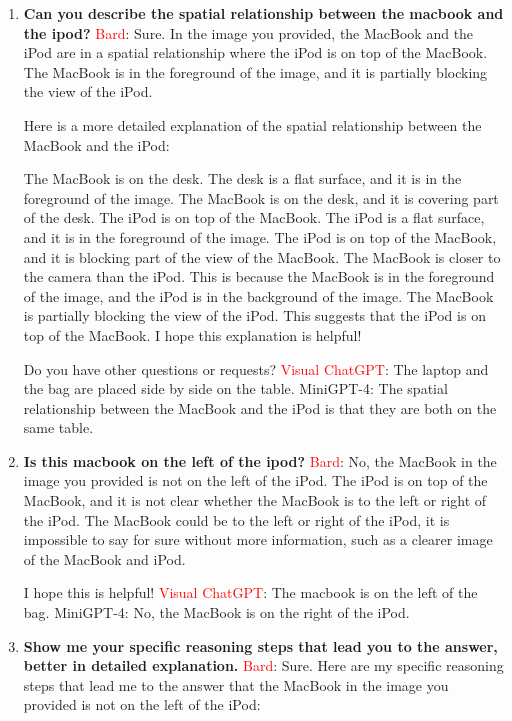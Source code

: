 \begin{enumerate}
    \item \textbf{Can you describe the spatial relationship between the macbook and the ipod?}
    \subitem \textcolor{Red}{Bard}: 
    Sure. In the image you provided, the MacBook and the iPod are in a spatial relationship where the iPod is on top of the MacBook. The MacBook is in the foreground of the image, and it is partially blocking the view of the iPod.
    
    Here is a more detailed explanation of the spatial relationship between the MacBook and the iPod:
    
    The MacBook is on the desk. The desk is a flat surface, and it is in the foreground of the image. The MacBook is on the desk, and it is covering part of the desk.
    The iPod is on top of the MacBook. The iPod is a flat surface, and it is in the foreground of the image. The iPod is on top of the MacBook, and it is blocking part of the view of the MacBook.
    The MacBook is closer to the camera than the iPod. This is because the MacBook is in the foreground of the image, and the iPod is in the background of the image.
    The MacBook is partially blocking the view of the iPod. This suggests that the iPod is on top of the MacBook.
    I hope this explanation is helpful!
    
    Do you have other questions or requests?
    \subitem \textcolor{red}{Visual ChatGPT}: The laptop and the bag are placed side by side on the table.
    \subitem MiniGPT-4: The spatial relationship between the MacBook and the iPod is that they are both on the same table.
    \item \textbf{Is this macbook on the left of the ipod?}
    \subitem \textcolor{Red}{Bard}: 
    No, the MacBook in the image you provided is not on the left of the iPod. The iPod is on top of the MacBook, and it is not clear whether the MacBook is to the left or right of the iPod. The MacBook could be to the left or right of the iPod, it is impossible to say for sure without more information, such as a clearer image of the MacBook and iPod.

    I hope this is helpful!
    \subitem \textcolor{red}{Visual ChatGPT}: The macbook is on the left of the bag.
    \subitem MiniGPT-4: No, the MacBook is on the right of the iPod.
    \item \textbf{Show me your specific reasoning steps that lead you to the answer, better in detailed explanation.}
    \subitem \textcolor{Red}{Bard}: 
    Sure. Here are my specific reasoning steps that lead me to the answer that the MacBook in the image you provided is not on the left of the iPod:
    

\end{enumerate}
